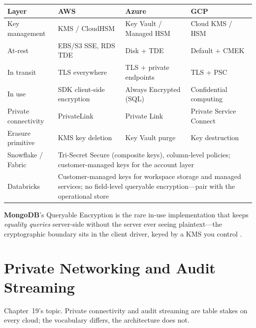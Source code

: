 \begin{center}
\footnotesize
\begin{tabular}{@{}p{2.9cm}p{3.0cm}p{3.0cm}p{3.0cm}@{}}
\toprule
\textbf{Layer} & \textbf{AWS} & \textbf{Azure} & \textbf{GCP} \\
\midrule
Key management & KMS / CloudHSM & Key Vault / Managed HSM & Cloud KMS / HSM \\
At-rest & EBS/S3 SSE, RDS TDE & Disk + TDE & Default + CMEK \\
In transit & TLS everywhere & TLS + private endpoints & TLS + PSC \\
In use & SDK client-side encryption & Always Encrypted (SQL) & Confidential computing \\
Private connectivity & PrivateLink & Private Link & Private Service Connect \\
Erasure primitive & KMS key deletion & Key Vault purge & Key destruction \\
\addlinespace
Snowflake / Fabric & \multicolumn{3}{l}{Tri-Secret Secure (composite keys), column-level policies; customer-managed keys for the account layer} \\
Databricks & \multicolumn{3}{l}{Customer-managed keys for workspace storage and managed services; no field-level queryable encryption---pair with the operational store} \\
\bottomrule
\end{tabular}
\end{center}

\noindent \textbf{MongoDB}'s Queryable Encryption is the rare in-use implementation that keeps
\emph{equality queries} server-side without the server ever seeing plaintext---the cryptographic
boundary sits in the client driver, keyed by a KMS you control
\cite{mongodbQueryableEncryptionDocs,mongodbCSFLEDocs}.

\section{Private Networking and Audit Streaming}
%
Chapter~19's topic. Private connectivity and audit streaming are table stakes on every cloud; the
vocabulary differs, the architecture does not.

